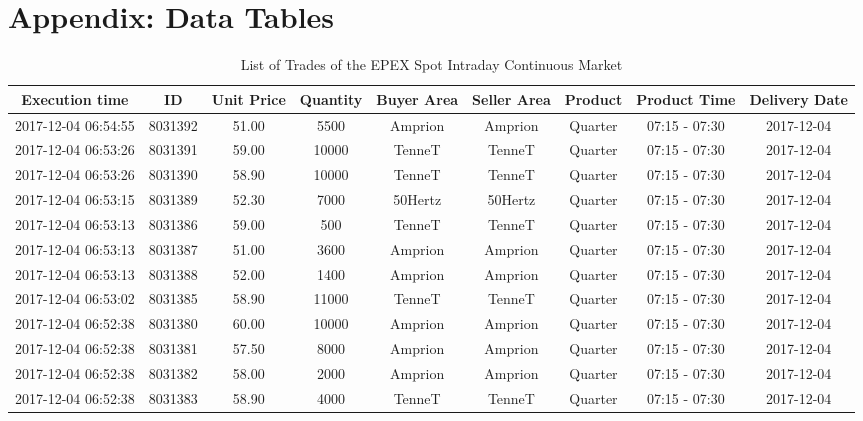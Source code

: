 \documentclass[a4paper, 12pt]{article}
\begin{document}
\clearpage

\appendix
\captionsetup[table]{list=no}
\captionsetup[figure]{list=no}


\section{Appendix: Data Tables \label{app-data-tables}}
\label{sec:org0f03730}
\renewcommand\thetable{\thesection.\arabic{table}}
\setcounter{table}{0}

{\captionsetup[table]{aboveskip=0.5cm}
\begin{table}
\caption{List of Trades of the EPEX Spot Intraday Continuous Market}
\centering
\begin{tabular}{c|cccccccc}
\hline
\hline
Execution time & ID & Unit Price & Quantity & Buyer Area & Seller Area & Product & Product Time & Delivery Date\\
\hline
2017-12-04 06:54:55 & 8031392 & 51.00 & 5500 & Amprion & Amprion & Quarter & 07:15 - 07:30 & 2017-12-04\\
2017-12-04 06:53:26 & 8031391 & 59.00 & 10000 & TenneT & TenneT & Quarter & 07:15 - 07:30 & 2017-12-04\\
2017-12-04 06:53:26 & 8031390 & 58.90 & 10000 & TenneT & TenneT & Quarter & 07:15 - 07:30 & 2017-12-04\\
2017-12-04 06:53:15 & 8031389 & 52.30 & 7000 & 50Hertz & 50Hertz & Quarter & 07:15 - 07:30 & 2017-12-04\\
2017-12-04 06:53:13 & 8031386 & 59.00 & 500 & TenneT & TenneT & Quarter & 07:15 - 07:30 & 2017-12-04\\
2017-12-04 06:53:13 & 8031387 & 51.00 & 3600 & Amprion & Amprion & Quarter & 07:15 - 07:30 & 2017-12-04\\
2017-12-04 06:53:13 & 8031388 & 52.00 & 1400 & Amprion & Amprion & Quarter & 07:15 - 07:30 & 2017-12-04\\
2017-12-04 06:53:02 & 8031385 & 58.90 & 11000 & TenneT & TenneT & Quarter & 07:15 - 07:30 & 2017-12-04\\
2017-12-04 06:52:38 & 8031380 & 60.00 & 10000 & Amprion & Amprion & Quarter & 07:15 - 07:30 & 2017-12-04\\
2017-12-04 06:52:38 & 8031381 & 57.50 & 8000 & Amprion & Amprion & Quarter & 07:15 - 07:30 & 2017-12-04\\
2017-12-04 06:52:38 & 8031382 & 58.00 & 2000 & Amprion & Amprion & Quarter & 07:15 - 07:30 & 2017-12-04\\
2017-12-04 06:52:38 & 8031383 & 58.90 & 4000 & TenneT & TenneT & Quarter & 07:15 - 07:30 & 2017-12-04\\

\end{tabular}
\end{table}}
\end{document}
